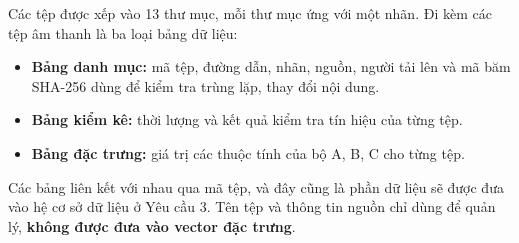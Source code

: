 \documentclass[11pt,a4paper]{article}
\begin{document}
Các tệp được xếp vào 13 thư mục, mỗi thư mục ứng với một nhãn. Đi kèm các tệp âm thanh là ba loại bảng dữ liệu:
\begin{itemize}
\item \textbf{Bảng danh mục:} mã tệp, đường dẫn, nhãn, nguồn, người tải lên và mã băm SHA-256 dùng để kiểm tra trùng lặp, thay đổi nội dung.
\item \textbf{Bảng kiểm kê:} thời lượng và kết quả kiểm tra tín hiệu của từng tệp.
\item \textbf{Bảng đặc trưng:} giá trị các thuộc tính của bộ A, B, C cho từng tệp.
\end{itemize}
Các bảng liên kết với nhau qua mã tệp, và đây cũng là phần dữ liệu sẽ được đưa vào hệ cơ sở dữ liệu ở Yêu cầu 3. Tên tệp và thông tin nguồn chỉ dùng để quản lý, \textbf{không được đưa vào vector đặc trưng}.
\end{document}
